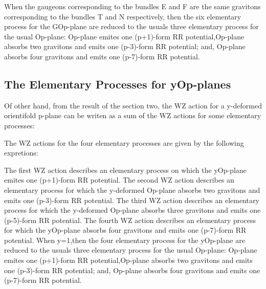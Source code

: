 \documentclass[a4paper,a4paper]{article}
\begin{document}
When the gaugeons corresponding to the bundles E and F are the same gravitons corresponding to the bundles T and N respectively, then the six elementary process for the GOp-plane are reduced to the usuals three elementary process for the usual Op-plane: Op-plane emites one (p+1)-form RR potential,Op-plane
absorbs two gravitons and emits one (p-3)-form RR potential; and, Op-plane absorbs four gravitons and emits one (p-7)-form RR potential.

\subsection{The Elementary Processes for yOp-planes }
Of other hand, from the result of the section two, the WZ action for a y-deformed orientifold p-plane can be writen as a sum of the WZ actions for some elementary processes:
\begin{center}
{  \coordHE{} }
\end{center}
The WZ actions for the four elementary processes are given by the following 
expretions:
\begin{center}
{  \coordHE{} }
\end{center} 
\begin{center}
{  \coordHE{} }
\end{center}
\begin{center}
{  \coordHE{} }
\end{center}
\begin{center}
{  \coordHE{} }
\end{center}

The first WZ action describes an elementary process on which the yOp-plane emites one (p+1)-form RR potential.
The second WZ action describes an elementary process for which the y-deformed
Op-plane absorbs two gravitons and emits one (p-3)-form RR potential.
The third WZ action describes an elementary process for which the y-deformed
Op-plane absorbs three gravitons and emits one (p-5)-form RR potential.
The fourth WZ action describes an elementary process for which the yOp-plane absorbs four gravitons and emits one (p-7)-form RR potential.
When y=1,then the four elementary process for the yOp-plane are reduced to the usuals three elementary process for the usual Op-plane: Op-plane emites one (p+1)-form RR potential,Op-plane
absorbs two gravitons and emits one (p-3)-form RR potential; and, Op-plane absorbs four gravitons and emits one (p-7)-form RR potential.
\end{document}
